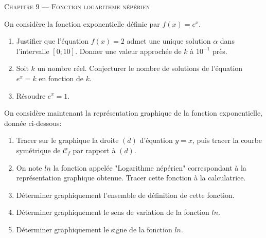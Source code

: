 \documentclass[a4paper]{article}
\begin{document}
\begin{center}
  {\scshape\LARGE Chapitre 9 --- Fonction logarithme népérien\par}
\end{center}
 
\begin{activite}{}{} 
On considère la fonction exponentielle définie par $f(x)=e^x$.

\begin{enumerate} 
  \item Justifier que l'équation $f(x)=2$ admet une unique solution $\alpha$ dans l'intervalle $[0;10]$. Donner une valeur approchée de $k$ à $10^{-1}$ près.
  \item Soit $k$ un nombre réel. Conjecturer le nombre de solutions de l'équation $e^x=k$ en fonction de $k$.
  \item Résoudre $e^x=1$.
\end{enumerate}
\end{activite}

\begin{activite}{}{}
On considère maintenant la représentation graphique de la fonction exponentielle, donnée ci-dessous:
\begin{center}
\end{center}

\begin{enumerate}
  \item Tracer sur le graphique la droite $(d)$ d'équation $y=x$, puis tracer la courbe symétrique de $\mathcal{C}_f$ par rapport à $(d)$.
  \item On note $ln$ la fonction appelée "Logarithme népérien" correspondant à la représentation graphique obtenue. Tracer cette fonction à la calculatrice.
  \item Déterminer graphiquement l'ensemble de définition de cette fonction.
  \vspace{2cm}
  \item Déterminer graphiquement le sens de variation de la fonction $ln$.
  \vspace{2.5cm}
  \item Déterminer graphiquement le signe de la fonction $ln$.
  \vspace{2.5cm}
\end{enumerate}
\end{activite}
\end{document}
